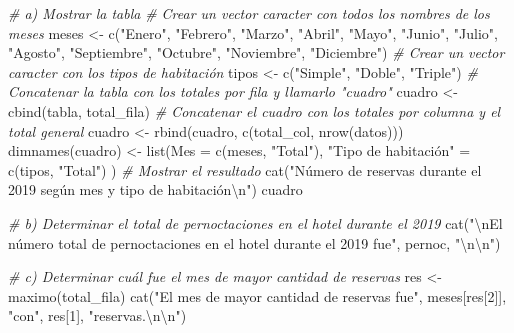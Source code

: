 \documentclass[
]{book}
\newenvironment{Shaded}{\begin{snugshade}}{\end{snugshade}}
\newcommand{\AttributeTok}[1]{\textcolor[rgb]{0.77,0.63,0.00}{#1}}
\newcommand{\CommentTok}[1]{\textcolor[rgb]{0.56,0.35,0.01}{\textit{#1}}}
\newcommand{\DecValTok}[1]{\textcolor[rgb]{0.00,0.00,0.81}{#1}}
\newcommand{\FunctionTok}[1]{\textcolor[rgb]{0.00,0.00,0.00}{#1}}
\newcommand{\NormalTok}[1]{#1}
\newcommand{\OtherTok}[1]{\textcolor[rgb]{0.56,0.35,0.01}{#1}}
\newcommand{\SpecialCharTok}[1]{\textcolor[rgb]{0.00,0.00,0.00}{#1}}
\newcommand{\StringTok}[1]{\textcolor[rgb]{0.31,0.60,0.02}{#1}}
\begin{document}
\begin{Shaded}
\begin{Highlighting}[]
\CommentTok{\# a) Mostrar la tabla}
\CommentTok{\# Crear un vector caracter con todos los nombres de los meses}
\NormalTok{meses }\OtherTok{\textless{}{-}} \FunctionTok{c}\NormalTok{(}\StringTok{"Enero"}\NormalTok{, }\StringTok{"Febrero"}\NormalTok{, }\StringTok{"Marzo"}\NormalTok{, }\StringTok{"Abril"}\NormalTok{,}
           \StringTok{"Mayo"}\NormalTok{, }\StringTok{"Junio"}\NormalTok{, }\StringTok{"Julio"}\NormalTok{, }\StringTok{"Agosto"}\NormalTok{,}
           \StringTok{"Septiembre"}\NormalTok{, }\StringTok{"Octubre"}\NormalTok{, }\StringTok{"Noviembre"}\NormalTok{, }\StringTok{"Diciembre"}\NormalTok{)}
\CommentTok{\# Crear un vector caracter con los tipos de habitación}
\NormalTok{tipos }\OtherTok{\textless{}{-}} \FunctionTok{c}\NormalTok{(}\StringTok{"Simple"}\NormalTok{, }\StringTok{"Doble"}\NormalTok{, }\StringTok{"Triple"}\NormalTok{)}
\CommentTok{\# Concatenar la tabla con los totales por fila y llamarlo "cuadro"}
\NormalTok{cuadro }\OtherTok{\textless{}{-}} \FunctionTok{cbind}\NormalTok{(tabla, total\_fila)}
\CommentTok{\# Concatenar el cuadro con los totales por columna y el total general}
\NormalTok{cuadro }\OtherTok{\textless{}{-}} \FunctionTok{rbind}\NormalTok{(cuadro, }\FunctionTok{c}\NormalTok{(total\_col, }\FunctionTok{nrow}\NormalTok{(datos)))}
\FunctionTok{dimnames}\NormalTok{(cuadro) }\OtherTok{\textless{}{-}} \FunctionTok{list}\NormalTok{(}\AttributeTok{Mes =} \FunctionTok{c}\NormalTok{(meses, }\StringTok{"Total"}\NormalTok{), }
                         \StringTok{"Tipo de habitación"} \OtherTok{=} \FunctionTok{c}\NormalTok{(tipos, }\StringTok{"Total"}\NormalTok{) )}
\CommentTok{\# Mostrar el resultado}
\FunctionTok{cat}\NormalTok{(}\StringTok{"Número de reservas durante el 2019 según mes y tipo de habitación}\SpecialCharTok{\textbackslash{}n}\StringTok{"}\NormalTok{)}
\NormalTok{cuadro}

\CommentTok{\# b) Determinar el total de pernoctaciones en el hotel durante el 2019}
\FunctionTok{cat}\NormalTok{(}\StringTok{"}\SpecialCharTok{\textbackslash{}n}\StringTok{El número total de pernoctaciones en el hotel durante el 2019 fue"}\NormalTok{, pernoc, }\StringTok{"}\SpecialCharTok{\textbackslash{}n\textbackslash{}n}\StringTok{"}\NormalTok{)}

\CommentTok{\# c) Determinar cuál fue el mes de mayor cantidad de reservas}
\NormalTok{res }\OtherTok{\textless{}{-}} \FunctionTok{maximo}\NormalTok{(total\_fila)}
\FunctionTok{cat}\NormalTok{(}\StringTok{"El mes de mayor cantidad de reservas fue"}\NormalTok{, meses[res[}\DecValTok{2}\NormalTok{]], }\StringTok{"con"}\NormalTok{, }
\NormalTok{    res[}\DecValTok{1}\NormalTok{], }\StringTok{"reservas.}\SpecialCharTok{\textbackslash{}n\textbackslash{}n}\StringTok{"}\NormalTok{)}


\end{Highlighting}
\end{Shaded}
\end{document}
